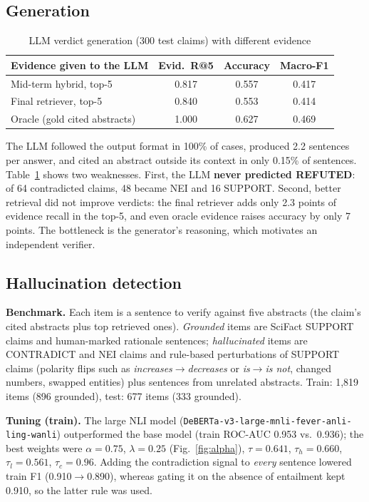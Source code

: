 \documentclass[conference]{IEEEtran}
\begin{document}
\subsection{Generation}
\begin{table}[t]
\centering
\caption{LLM verdict generation (300 test claims) with different evidence}
\label{tab:gen}
\footnotesize
\begin{tabular}{@{}lccc@{}}
\toprule
Evidence given to the LLM & Evid.\ R@5 & Accuracy & Macro-F1 \\
\midrule
Mid-term hybrid, top-5 & 0.817 & 0.557 & 0.417 \\
Final retriever, top-5 & 0.840 & 0.553 & 0.414 \\
Oracle (gold cited abstracts) & 1.000 & 0.627 & 0.469 \\
\bottomrule
\end{tabular}
\end{table}
The LLM followed the output format in 100\% of cases, produced 2.2 sentences per answer, and cited an abstract outside its
context in only 0.15\% of sentences. Table~\ref{tab:gen} shows two weaknesses. First, the LLM \textbf{never predicted
REFUTED}: of 64 contradicted claims, 48 became NEI and 16 SUPPORT. Second, better retrieval did not improve verdicts: the
final retriever adds only 2.3 points of evidence recall in the top-5, and even oracle evidence raises accuracy by only 7
points. The bottleneck is the generator's reasoning, which motivates an independent verifier.

\subsection{Hallucination detection}\label{sec:det}
\textbf{Benchmark.} Each item is a sentence to verify against five abstracts (the claim's cited abstracts plus top
retrieved ones). \emph{Grounded} items are SciFact SUPPORT claims and human-marked rationale sentences;
\emph{hallucinated} items are CONTRADICT and NEI claims and rule-based perturbations of SUPPORT claims (polarity flips such
as \emph{increases}$\to$\emph{decreases} or \emph{is}$\to$\emph{is not}, changed numbers, swapped entities) plus sentences
from unrelated abstracts. Train: 1,819 items (896 grounded), test: 677 items (333 grounded).

\textbf{Tuning (train).} The large NLI model (\texttt{DeBERTa-v3-large-mnli-fever-anli-ling-wanli}) outperformed the base
model (train ROC-AUC 0.953 vs.\ 0.936); the best weights were $\alpha=0.75$, $\lambda=0.25$ (Fig.~\ref{fig:alpha}),
$\tau=0.641$, $\tau_h=0.660$, $\tau_l=0.561$, $\tau_c=0.96$. Adding the contradiction signal to \emph{every} sentence
lowered train F1 (0.910$\to$0.890), whereas gating it on the absence of entailment kept 0.910, so the latter rule was used.
\end{document}
